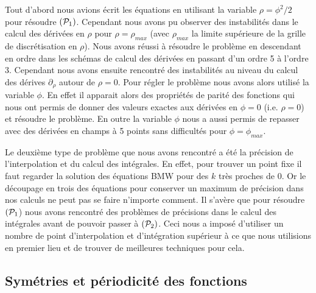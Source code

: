 \documentclass[10.5pt]{article}
\begin{document}
\begin{multicols}{2}
Tout d'abord nous avions écrit les équations en utilisant la variable $\rho = \phi^2/2$ pour résoudre $(\mathcal{P}_1)$. Cependant nous avons pu observer des instabilités dans le calcul des dérivées en $\rho$ pour $\rho = \rho_{max}$ (avec $\rho_{max}$ la limite supérieure de la grille de discrétisation en $\rho$). Nous avons réussi à résoudre le problème en descendant en ordre dans les schémas de calcul des dérivées en passant d'un ordre 5 à l'ordre 3. Cependant nous avons ensuite rencontré des instabilités au niveau du calcul des dérives $\partial_{\rho}$ autour de $\rho = 0$. Pour régler le problème nous avons alors utilisé la variable $\phi$. En effet il apparait alors des propriétés de parité des fonctions qui nous ont permis de donner des valeurs exactes aux dérivées en $\phi = 0$ (i.e. $\rho = 0$) et résoudre le problème. En outre la variable $\phi$ nous a aussi permis de repasser avec des dérivées en champs à 5 points sans difficultés pour $\phi = \phi_{max}$. 

Le deuxième type de problème que nous avons rencontré a été la précision de l'interpolation et du calcul des intégrales. En effet, pour trouver un point fixe il faut regarder la solution des équations BMW pour des $k$ très proches de 0. Or le découpage en trois des équations pour conserver un maximum de précision dans nos calculs ne peut pas se faire n'importe comment. Il s'avère que pour résoudre $(\mathcal{P}_1$) nous avons rencontré des problèmes de précisions dans le calcul des intégrales avant de pouvoir passer à $(\mathcal{P}_2)$. Ceci nous a imposé d'utiliser un nombre de point d'interpolation et d'intégration supérieur à ce que nous utilisions en premier lieu et de trouver de meilleures techniques pour cela. 



\subsection{Symétries et périodicité des fonctions}

\label{sec:Sym}


\end{multicols}
\end{document}
